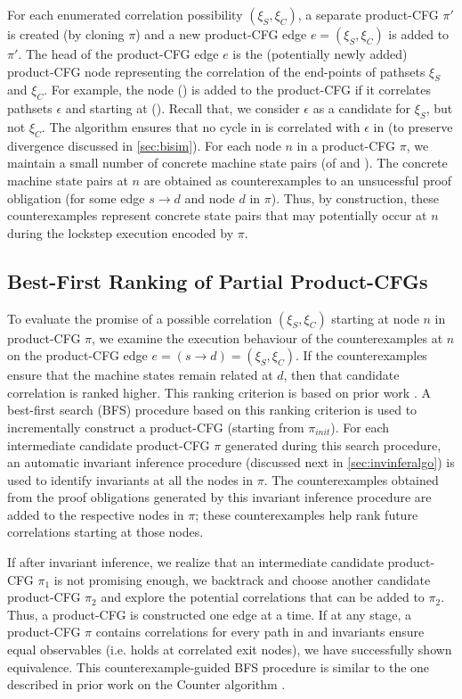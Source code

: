 For each enumerated correlation possibility $(\xi_S,\xi_C)$, a separate product-CFG $\pi'$ is
created (by cloning $\pi$) and a new product-CFG edge $e=(\xi_S,\xi_C)$ is added to $\pi'$.
The head of the product-CFG edge $e$ is the (potentially newly added) product-CFG node representing
the correlation of the end-points of pathsets $\xi_S$ and $\xi_C$. For example, the node () is added
to the product-CFG if it correlates pathsets $\epsilon$ and  starting at ().
Recall that, we consider $\epsilon$ as a candidate for $\xi_S$, but not $\xi_C$.
The algorithm ensures that no cycle in \cprog{} is correlated with $\epsilon$ in \sprog{}
(to preserve divergence discussed in \cref{sec:bisim}).
For each node $n$ in a product-CFG $\pi$, we maintain a small number of
concrete machine state pairs (of \sprog{} and \cprog{}).
The concrete machine state pairs at $n$ are obtained as counterexamples to an unsucessful proof
obligation  (for some edge $s \rightarrow d$ and node $d$ in $\pi$).
Thus, by construction, these counterexamples represent concrete state pairs that may potentially occur
at $n$ during the lockstep execution encoded by $\pi$.

\subsection{Best-First Ranking of Partial Product-CFGs}
\label{sec:rankproductcfg}
To evaluate the promise of a possible correlation $(\xi_S,\xi_C)$ starting at node $n$
in product-CFG $\pi$, we examine the execution behaviour of the counterexamples at $n$ on
the product-CFG edge $e=(s\rightarrow d)=(\xi_S,\xi_C)$.
If the counterexamples ensure that the machine states remain related at $d$,
then that candidate correlation is ranked higher.
This ranking criterion is based on prior work \cite{oopsla20}.
A best-first search (BFS) procedure based on this ranking criterion is used to incrementally construct
a product-CFG (starting from $\pi_{init}$).
For each intermediate candidate product-CFG $\pi$ generated during this search procedure,
an automatic invariant inference procedure (discussed next in \cref{sec:invinferalgo}) is
used to identify invariants at all the nodes in $\pi$.
The counterexamples obtained from the proof obligations generated by this invariant inference
procedure are added to the respective nodes in $\pi$; these counterexamples help rank
future correlations starting at those nodes.

If after invariant inference, we realize that an intermediate candidate product-CFG $\pi_1$
is not promising enough, we backtrack and choose another candidate product-CFG $\pi_2$
and explore the potential correlations that can be added to $\pi_2$.
Thus, a product-CFG is constructed one edge at a time.
If at any stage, a product-CFG $\pi$ contains correlations for every path in \cprog{}
and invariants ensure equal observables (i.e. \post{} holds at correlated exit nodes),
we have successfully shown equivalence.
This counterexample-guided BFS procedure is similar to the one described in prior work on
the Counter algorithm \cite{oopsla20}.

